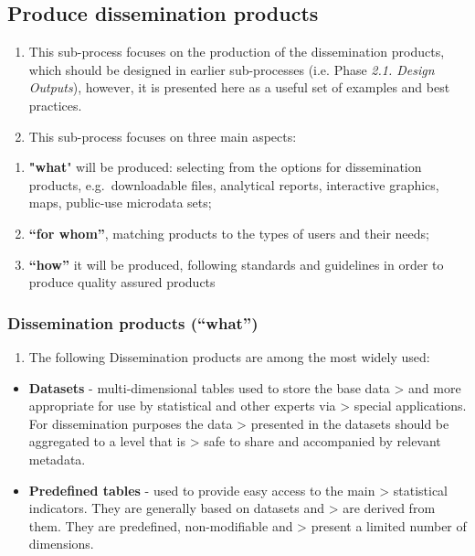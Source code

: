\documentclass[
]{article}
\providecommand{\tightlist}{%
  \setlength{\itemsep}{0pt}\setlength{\parskip}{0pt}}
\begin{document}
\hypertarget{produce-dissemination-products-1}{%
\subsection{Produce dissemination products}\label{produce-dissemination-products-1}}

\begin{enumerate}
\def\labelenumi{\arabic{enumi}.}
\setcounter{enumi}{509}
\item
  This sub-process focuses on the production of the dissemination
  products, which should be designed in earlier sub-processes (i.e.
  Phase \emph{2.1. Design Outputs}), however, it is presented here as a
  useful set of examples and best practices.
\item
  This sub-process focuses on three main aspects:
\end{enumerate}

\begin{enumerate}
\def\labelenumi{\roman{enumi}.}
\item
  \textbf{"what}" will be produced: selecting from the options for
  dissemination products, e.g.~downloadable files, analytical reports,
  interactive graphics, maps, public-use microdata sets;
\item
  \textbf{``for whom''}, matching products to the types of users and their
  needs;
\item
  \textbf{``how''} it will be produced, following standards and guidelines
  in order to produce quality assured products
\end{enumerate}

\hypertarget{dissemination-products-what}{%
\subsubsection{Dissemination products (``what'')}\label{dissemination-products-what}}

\begin{enumerate}
\def\labelenumi{\arabic{enumi}.}
\setcounter{enumi}{511}
\tightlist
\item
  The following Dissemination products are among the most widely
  used:
\end{enumerate}

\begin{itemize}
\item
  \textbf{Datasets} - multi-dimensional tables used to store the base data
  \textgreater{} and more appropriate for use by statistical and other experts via
  \textgreater{} special applications. For dissemination purposes the data
  \textgreater{} presented in the datasets should be aggregated to a level that is
  \textgreater{} safe to share and accompanied by relevant metadata.
\item
  \textbf{Predefined tables} - used to provide easy access to the main
  \textgreater{} statistical indicators. They are generally based on datasets and
  \textgreater{} are derived from them. They are predefined, non-modifiable and
  \textgreater{} present a limited number of dimensions.
\end{itemize}
\end{document}
